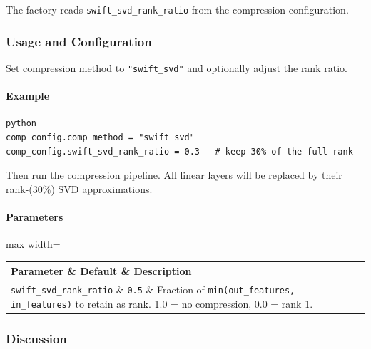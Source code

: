 The factory reads \texttt{swift\_svd\_rank\_ratio} from the compression configuration.


\subsubsection*{Usage and Configuration}

Set compression method to \texttt{"swift\_svd"} and optionally adjust the rank ratio.

\paragraph{Example}

\vspace{0.5em}
\begin{mdframed}[backgroundcolor=codebg, linecolor=codeframe, linewidth=1pt, roundcorner=4pt, innerleftmargin=2pt, innerrightmargin=5pt, innertopmargin=5pt, innerbottommargin=5pt]
\begin{lstlisting}
python
comp_config.comp_method = "swift_svd"
comp_config.swift_svd_rank_ratio = 0.3   # keep 30% of the full rank
\end{lstlisting}
\end{mdframed}
\vspace{0.5em}

Then run the compression pipeline. All linear layers will be replaced by their rank-(30\%) SVD approximations.

\paragraph{Parameters}

\begin{center}
\begin{adjustbox}{max width=\columnwidth}
\renewcommand{\arraystretch}{1.2}
\begin{tabular}{lll}
\toprule
Parameter \& Default \& Description \\
\midrule
\texttt{swift\_svd\_rank\_ratio} \& \texttt{0.5} \& Fraction of \texttt{min(out\_features, in\_features)} to retain as rank. 1.0 = no compression, 0.0 = rank 1. \\

\bottomrule
\end{tabular}
\end{adjustbox}
\end{center}

\subsubsection*{Discussion}

